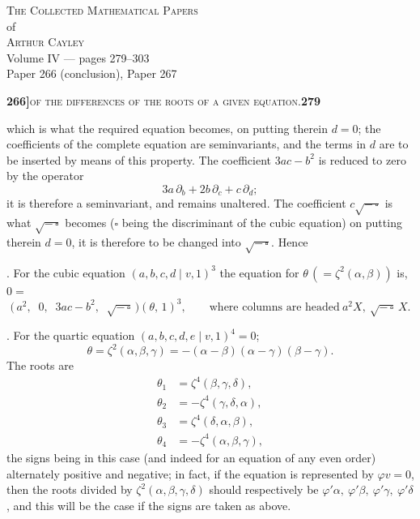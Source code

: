 \documentclass[11pt]{article}
\newcommand{\Cdel}{\mid}
\begin{document}
\thispagestyle{empty}
\begin{center}
\vspace*{2cm}
{\Large\scshape The Collected Mathematical Papers}\\[0.4em]
{\large of}\\[0.4em]
{\Large\scshape Arthur Cayley}\\[1.5em]
{\large Volume IV --- pages 279--303}\\[0.6em]
{\normalsize Paper 266 (conclusion), Paper 267}\\[2em]
\vfill
\end{center}
\newpage

\setcounter{page}{279}


\noindent\textbf{266]}\hfill\textsc{of the differences of the roots of a given equation.}\hfill\textbf{279}

\medskip

\noindent which is what the required equation becomes, on putting therein $d = 0$; the coefficients of the complete equation are seminvariants, and the terms in $d$ are to be inserted by means of this property. The coefficient $3ac - b^2$ is reduced to zero by the operator
\[
   3 a\,\partial_b + 2 b\,\partial_c + c\,\partial_d;
\]
it is therefore a seminvariant, and remains unaltered. The coefficient $c\sqrt{-\,\square}$ is what $\sqrt{-\,\square}$ becomes ($\square$ being the discriminant of the cubic equation) on putting therein $d = 0$, it is therefore to be changed into $\sqrt{-\,\square}$. Hence

\medskip

. For the cubic equation $(a, b, c, d \Cdel v, 1)^3$ the equation for $\theta\,(=\zeta^2(\alpha, \beta))$ is, $0 =$
\[
\bigl(\,a^2,\;\; 0,\;\; 3ac - b^2,\;\; \sqrt{-\,\square}\,\bigr)(\theta,\,1)^3,
\qquad\text{where columns are headed}\ a^2 X,\ \sqrt{-\,\square}\,X.
\]

\medskip

. For the quartic equation $(a, b, c, d, e \Cdel v, 1)^4 = 0$;
\[
   \theta = \zeta^2(\alpha, \beta, \gamma) = -(\alpha - \beta)(\alpha - \gamma)(\beta - \gamma).
\]
The roots are
\[
\begin{aligned}
   \theta_1 &=  \zeta^4(\beta, \gamma, \delta),\\
   \theta_2 &= -\zeta^4(\gamma, \delta, \alpha),\\
   \theta_3 &=  \zeta^4(\delta, \alpha, \beta),\\
   \theta_4 &= -\zeta^4(\alpha, \beta, \gamma),
\end{aligned}
\]
the signs being in this case (and indeed for an equation of any even order) alternately positive and negative; in fact, if the equation is represented by $\varphi v = 0$, then the roots divided by $\zeta^2(\alpha, \beta, \gamma, \delta)$ should respectively be $\varphi'\alpha,\ \varphi'\beta,\ \varphi'\gamma,\ \varphi'\delta$, and this will be the case if the signs are taken as above.
\end{document}
